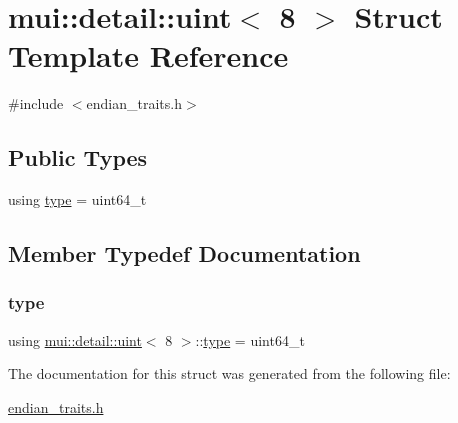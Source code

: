 \hypertarget{structmui_1_1detail_1_1uint_3_018_01_4}{}\section{mui\+:\+:detail\+:\+:uint$<$ 8 $>$ Struct Template Reference}
\label{structmui_1_1detail_1_1uint_3_018_01_4}


{\ttfamily \#include $<$endian\+\_\+traits.\+h$>$}

\subsection*{Public Types}
\begin{DoxyCompactItemize}
\item 
using \hyperlink{structmui_1_1detail_1_1uint_3_018_01_4_a9464ab42ee10946f1ad954eedfd36e51}{type} = uint64\+\_\+t
\end{DoxyCompactItemize}


\subsection{Member Typedef Documentation}
\mbox{\label{structmui_1_1detail_1_1uint_3_018_01_4_a9464ab42ee10946f1ad954eedfd36e51}} 
\subsubsection{\texorpdfstring{type}{type}}
{\footnotesize\ttfamily using \hyperlink{structmui_1_1detail_1_1uint}{mui\+::detail\+::uint}$<$ 8 $>$\+::\hyperlink{structmui_1_1detail_1_1uint_3_018_01_4_a9464ab42ee10946f1ad954eedfd36e51}{type} =  uint64\+\_\+t}



The documentation for this struct was generated from the following file\+:\begin{DoxyCompactItemize}
\item 
\hyperlink{endian__traits_8h}{endian\+\_\+traits.\+h}\end{DoxyCompactItemize}
